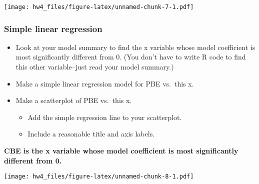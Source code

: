 \documentclass[]{article}
\newenvironment{Shaded}{\begin{snugshade}}{\end{snugshade}}
\newcommand{\KeywordTok}[1]{\textcolor[rgb]{0.13,0.29,0.53}{\textbf{#1}}}
\newcommand{\DataTypeTok}[1]{\textcolor[rgb]{0.13,0.29,0.53}{#1}}
\newcommand{\DecValTok}[1]{\textcolor[rgb]{0.00,0.00,0.81}{#1}}
\newcommand{\StringTok}[1]{\textcolor[rgb]{0.31,0.60,0.02}{#1}}
\newcommand{\OperatorTok}[1]{\textcolor[rgb]{0.81,0.36,0.00}{\textbf{#1}}}
\newcommand{\NormalTok}[1]{#1}
\providecommand{\tightlist}{%
  \setlength{\itemsep}{0pt}\setlength{\parskip}{0pt}}
\begin{document}
\texttt{[image: hw4\_files/figure-latex/unnamed-chunk-7-1.pdf]}

\subsubsection{Simple linear regression}\label{simple-linear-regression}

\begin{itemize}
\tightlist
\item
  Look at your model summary to find the x variable whose model
  coefficient is most significantly different from 0. (You don't have to
  write R code to find this other variable--just read your model
  summary.)
\item
  Make a simple linear regression model for PBE vs.~this x.
\item
  Make a scatterplot of PBE vs.~this x.

  \begin{itemize}
  \tightlist
  \item
    Add the simple regression line to your scatterplot.
  \item
    Include a reasonable title and axis labels.
  \end{itemize}
\end{itemize}

\textbf{CBE is the x variable whose model coefficient is most
significantly different from 0.}

\begin{Shaded}
\end{Shaded}

\texttt{[image: hw4\_files/figure-latex/unnamed-chunk-8-1.pdf]}
\end{document}
